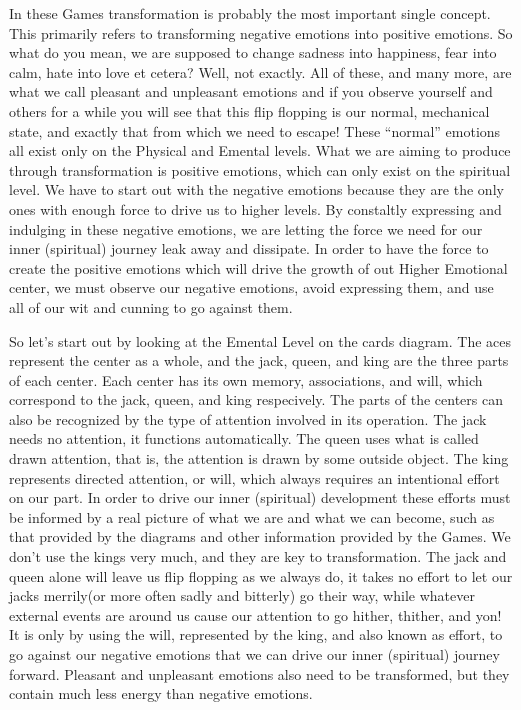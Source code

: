 \documentclass[12pt,letterpaper]{book}
\begin{document}
In these Games transformation is probably the most important single concept. This primarily refers to transforming negative emotions into positive emotions. So what do you mean, we are supposed to change sadness into happiness, fear into calm, hate into love et cetera? Well, not exactly. All of these, and many more, are what we call pleasant and unpleasant emotions and if you observe yourself and others for a while you will see that this flip flopping is our normal, mechanical state, and exactly that from which we need to escape! These ``normal'' emotions all exist only on the Physical and Emental levels. What we are aiming to produce through transformation is positive emotions, which can only exist on the spiritual level. We have to start out with the negative emotions because they are the only ones with enough force to drive us to higher levels. By constaltly expressing and indulging in these negative emotions, we are letting the force we need for our inner (spiritual) journey leak away and dissipate. In order to have the force to create the positive emotions which will drive the growth of out Higher Emotional center, we must observe our negative emotions, avoid expressing them, and use all of our wit and cunning to go against them.

So let's start out by looking at the Emental Level on the cards diagram. The aces represent the center as a whole, and the jack, queen, and king are the three parts of each center. Each center has its own memory, associations, and will, which correspond to the jack, queen, and king respecively. The parts of the centers can also be recognized by the type of attention involved in its operation. The jack needs no attention, it functions automatically. The queen uses what is called drawn attention, that is, the attention is drawn by some outside object. The king represents directed attention, or will, which always requires an intentional effort on our part. In order to drive our inner (spiritual) development these efforts must be informed by a real picture of what we are and what we can become, such as that provided by the diagrams and other information provided by the Games. We don't use the kings very much, and they are key to transformation. The jack and queen alone will leave us flip flopping as we always do, it takes no effort to let our jacks merrily(or more often sadly and bitterly) go their way, while whatever external events are around us cause our attention to go hither, thither, and yon! It is only by using the will, represented by the king, and also known as effort, to go against our negative emotions that we can drive our inner (spiritual) journey forward. Pleasant and unpleasant emotions also need to be transformed, but they contain much less energy than negative emotions.
\end{document}
